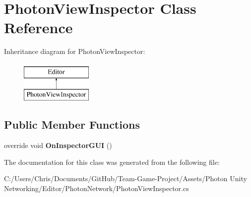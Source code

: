 \hypertarget{class_photon_view_inspector}{}\section{Photon\+View\+Inspector Class Reference}
\label{class_photon_view_inspector}
Inheritance diagram for Photon\+View\+Inspector\+:\begin{figure}[H]
\begin{center}
\leavevmode
\includegraphics[height=2.000000cm]{class_photon_view_inspector}
\end{center}
\end{figure}
\subsection*{Public Member Functions}
\begin{DoxyCompactItemize}
\item 
override void {\bfseries On\+Inspector\+G\+UI} ()\hypertarget{class_photon_view_inspector_aa96f95df2145dca1d60907a4e8ca6ddd}{}\label{class_photon_view_inspector_aa96f95df2145dca1d60907a4e8ca6ddd}

\end{DoxyCompactItemize}


The documentation for this class was generated from the following file\+:\begin{DoxyCompactItemize}
\item 
C\+:/\+Users/\+Chris/\+Documents/\+Git\+Hub/\+Team-\/\+Game-\/\+Project/\+Assets/\+Photon Unity Networking/\+Editor/\+Photon\+Network/Photon\+View\+Inspector.\+cs\end{DoxyCompactItemize}
